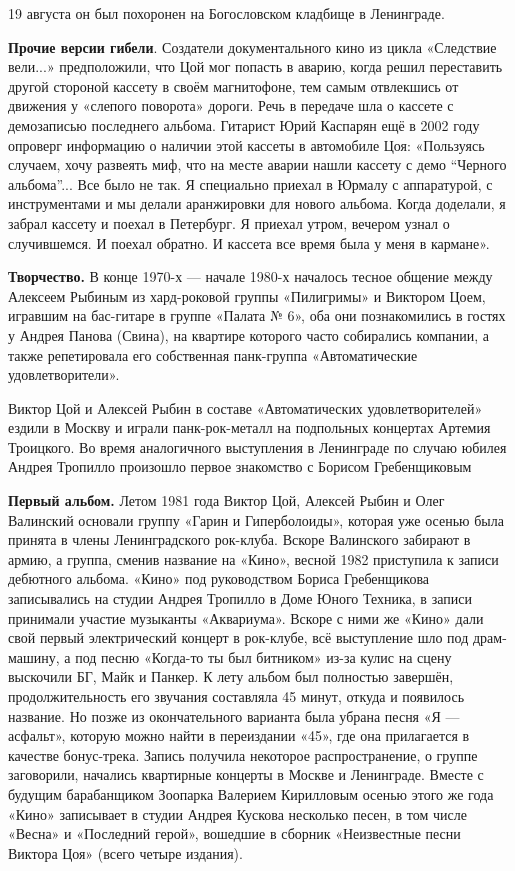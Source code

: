 19 августа он был похоронен на Богословском кладбище в Ленинграде.

\textbf{Прочие версии гибели}.
Создатели документального кино из цикла «Следствие вели...» предположили, что Цой мог попасть в аварию, когда решил переставить другой стороной кассету в своём магнитофоне, тем самым отвлекшись от движения у «слепого поворота» дороги. Речь в передаче шла о кассете с демозаписью последнего альбома. Гитарист Юрий Каспарян ещё в 2002 году опроверг информацию о наличии этой кассеты в автомобиле Цоя: «Пользуясь случаем, хочу развеять миф, что на месте аварии нашли кассету с демо ``Черного альбома''... Все было не так. Я специально приехал в Юрмалу с аппаратурой, с инструментами и мы делали аранжировки для нового альбома. Когда доделали, я забрал кассету и поехал в Петербург. Я приехал утром, вечером узнал о случившемся. И поехал обратно. И кассета все время была у меня в кармане».


\textbf{Творчество.}
В конце 1970-х --- начале 1980-х началось тесное общение между Алексеем Рыбиным из хард-роковой группы «Пилигримы» и Виктором Цоем, игравшим на бас-гитаре в группе «Палата № 6», оба они познакомились в гостях у Андрея Панова (Свина), на квартире которого часто собирались компании, а также репетировала его собственная панк-группа «Автоматические удовлетворители».

Виктор Цой и Алексей Рыбин в составе «Автоматических удовлетворителей» ездили в Москву и играли панк-рок-металл на подпольных концертах Артемия Троицкого. Во время аналогичного выступления в Ленинграде по случаю юбилея Андрея Тропилло произошло первое знакомство с Борисом Гребенщиковым

\textbf{Первый альбом.}
Летом 1981 года Виктор Цой, Алексей Рыбин и Олег Валинский основали группу «Гарин и Гиперболоиды», которая уже осенью была принята в члены Ленинградского рок-клуба. Вскоре Валинского забирают в армию, а группа, сменив название на «Кино», весной 1982 приступила к записи дебютного альбома. «Кино» под руководством Бориса Гребенщикова записывались на студии Андрея Тропилло в Доме Юного Техника, в записи принимали участие музыканты «Аквариума». Вскоре с ними же «Кино» дали свой первый электрический концерт в рок-клубе, всё выступление шло под драм-машину, а под песню «Когда-то ты был битником» из-за кулис на сцену выскочили БГ, Майк и Панкер. К лету альбом был полностью завершён, продолжительность его звучания составляла 45 минут, откуда и появилось название. Но позже из окончательного варианта была убрана песня «Я --- асфальт», которую можно найти в переиздании «45», где она прилагается в качестве бонус-трека. Запись получила некоторое распространение, о группе заговорили, начались квартирные концерты в Москве и Ленинграде. Вместе с будущим барабанщиком Зоопарка Валерием Кирилловым осенью этого же года «Кино» записывает в студии Андрея Кускова несколько песен, в том числе «Весна» и «Последний герой», вошедшие в сборник «Неизвестные песни Виктора Цоя» (всего четыре издания).

